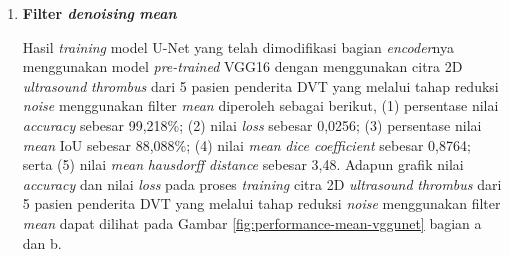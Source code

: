 \begin{enumerate}
	\item \textbf{Filter \textit{denoising} \textit{mean}}
	
	Hasil \textit{training} model U-Net yang telah dimodifikasi bagian \textit{encoder}nya menggunakan model \textit{pre-trained} VGG16 dengan menggunakan citra 2D \textit{ultrasound} \textit{thrombus} dari 5 pasien penderita DVT yang melalui tahap reduksi \textit{noise} menggunakan filter \textit{mean} diperoleh sebagai berikut, (1) persentase nilai \textit{accuracy} sebesar 99,218\%; (2) nilai \textit{loss} sebesar 0,0256; (3) persentase nilai \textit{mean} IoU sebesar 88,088\%; (4) nilai \textit{mean} \textit{dice coefficient} sebesar 0,8764; serta (5) nilai \textit{mean} \textit{hausdorff distance} sebesar 3,48. Adapun grafik nilai \textit{accuracy} dan nilai \textit{loss} pada proses \textit{training} citra 2D \textit{ultrasound} \textit{thrombus} dari 5 pasien penderita DVT yang melalui tahap reduksi \textit{noise} menggunakan filter \textit{mean} dapat dilihat pada Gambar \ref{fig:performance-mean-vggunet} bagian a dan b.
	

\end{enumerate}
